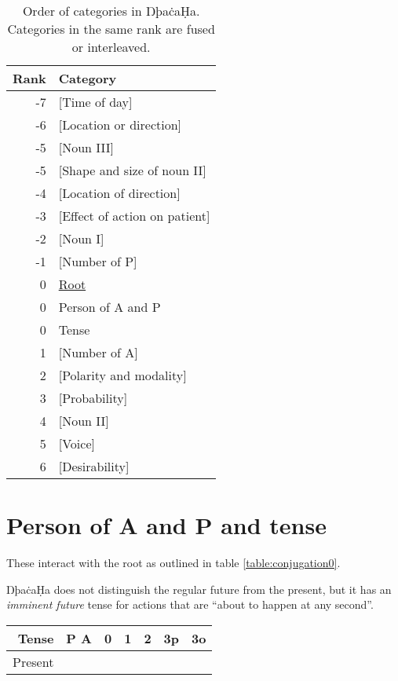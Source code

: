\documentclass{book}
\newcommand{\lname}{ŊþaċaḤa}
\begin{document}
\begin{table}[ht]
  \caption{Order of categories in \lname. Categories in the same rank are fused or interleaved.}
  \centering
  \begin{tabular}{r|l}
    Rank & Category \\
    \hline
    -7 & [Time of day] \\
    -6 & [Location or direction] \\
    -5 & [Noun III] \\
    -5 & [Shape and size of noun II] \\
    -4 & [Location of direction] \\
    -3 & [Effect of action on patient] \\
    -2 & [Noun I] \\
    -1 & [Number of P] \\
    0 & \underline{Root} \\
    0 & Person of A and P \\
    0 & Tense \\
    1 & [Number of A] \\
    2 & [Polarity and modality] \\
    3 & [Probability] \\
    4 & [Noun II] \\
    5 & [Voice] \\
    6 & [Desirability] \\
  \end{tabular}
\end{table}

\section{Person of A and P and tense}

These interact with the root as outlined in table \ref{table:conjugation0}.

\lname{} does not distinguish the regular future from the present, but it has an \emph{imminent future} tense for actions that are ``about to happen at any second''.

\begin{table}[ht]
  \caption{Interactions with the root.}
  \label{table:conjugation0}
  \centering
  \begin{longtable}[c]{r|l|lllll}
    Tense & P \bs{} A & 0 & 1 & 2 & 3p & 3o \\
    \hline
    \multirow{5}{*}{Present} &
  \end{longtable}
\end{table}
\end{document}
